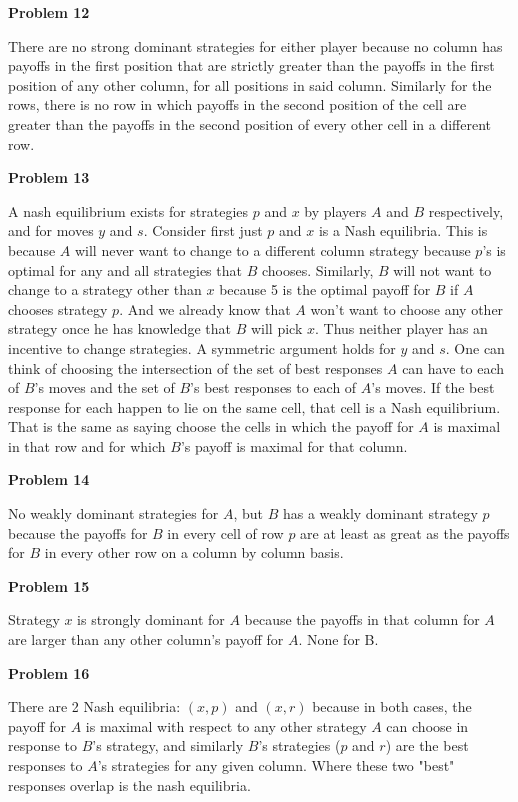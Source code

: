 \documentclass[12pt]{article}
\makeatletter
\newcommand{\exercise}[1]{\par\vspace{4ex}\normalfont\normalsize\noindent
\textbf{\large Problem #1}\par\nobreak\@afterindentfalse\@afterheading\vspace{.75ex}}
\makeatother
\begin{document}
\exercise{12} There are no strong dominant strategies for either player because no column has payoffs in the first position that are strictly greater than the payoffs in the first position of any other column, for all positions in said column. Similarly for the rows, there is no row in which payoffs in the second position of the cell are greater than the payoffs in the second position of every other cell in a different row. 

\exercise{13} A nash equilibrium exists for strategies $p$ and $x$ by players $A$ and $B$ respectively, and for moves $y$ and $s$. Consider first just $p$ and $x$ is a Nash equilibria. This is because $A$ will never want to change to a different column strategy because $p$'s is optimal for any and all strategies that $B$ chooses. Similarly, $B$ will not want to change to a strategy other than $x$ because 5 is the optimal payoff for $B$ if $A$ chooses strategy $p$. And we already know that $A$ won't want to choose any other strategy once he has knowledge that $B$ will pick $x$. Thus neither player has an incentive to change strategies. A symmetric argument holds for $y$ and $s$. One can think of choosing the intersection of the set of best responses $A$ can have to each of $B$'s moves and the set of $B$'s best responses to each of $A$'s moves. If the best response for each happen to lie on the same cell, that cell is a Nash equilibrium. That is the same as saying choose the cells in which the payoff for $A$ is maximal in that row and for which $B$'s payoff is maximal for that column. 

\exercise{14} No weakly dominant strategies for $A$, but $B$ has a weakly dominant strategy $p$ because the payoffs for $B$ in every cell of row $p$ are at least as great as the payoffs for $B$ in every other row on a column by column basis. 

\exercise{15} Strategy $x$ is strongly dominant for $A$ because the payoffs in that column for $A$ are larger than any other column's payoff for $A$. None for B. 

\exercise{16} There are 2 Nash equilibria: $(x, p)$ and $(x, r)$ because in both cases, the payoff for $A$ is maximal with respect to any other strategy $A$ can choose in response to $B$'s strategy, and similarly $B$'s strategies ($p$ and $r$) are the best responses to $A$'s strategies for any given column. Where these two "best" responses overlap is the nash equilibria. 
\end{document}
